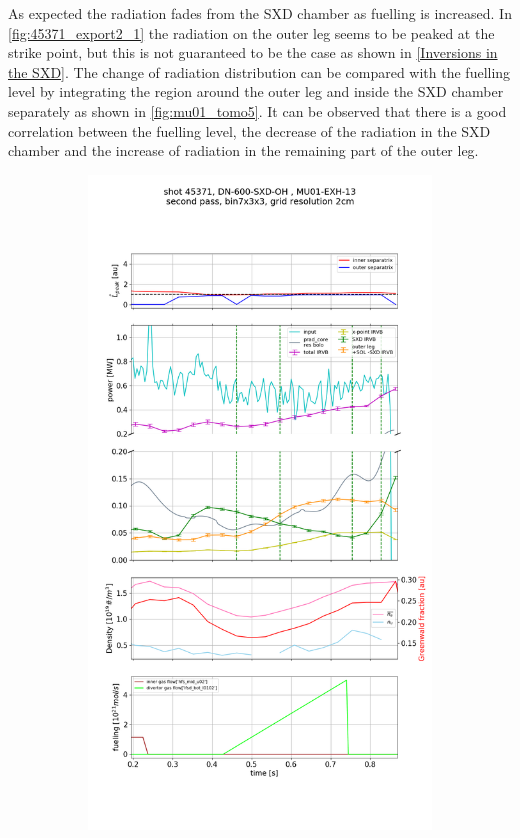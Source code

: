 As expected the radiation fades from the SXD chamber as fuelling is increased. In \autoref{fig:45371_export2_1} the radiation on the outer leg seems to be peaked at the strike point, but this is not guaranteed to be the case as shown in \autoref{Inversions in the SXD}. The change of radiation distribution can be compared with the fuelling level by integrating the region around the outer leg and inside the SXD chamber separately as shown in \autoref{fig:mu01_tomo5}. It can be observed that there is a good correlation between the fuelling level, the decrease of the radiation in the SXD chamber and the increase of radiation in the remaining part of the outer leg.

\begin{figure}[!ht]
     \centering
     \begin{subfigure}{0.8\linewidth}
         \centering
         \includegraphics[trim={0 555 0 310},clip,width=\textwidth]{Chapters/chapter2/figs/IRVB-MASTU_shot-45371_pass1_bin7x3x3_gridres2cm_all_variables_absolute_small4.png}

\end{subfigure}
\end{figure}
